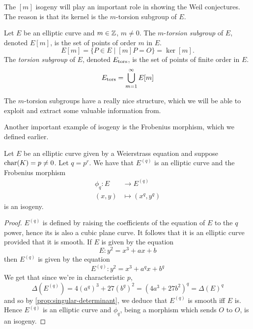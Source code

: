 The $[m]$ isogeny will play an important role in showing the
Weil conjectures. The reason is that its kernel is the $m$-torsion
subgroup of $E$.


\begin{definition}
	Let $E$ be an elliptic curve and $m \in \mathbb{Z}$, $m \neq 0$. The
	$m$-\emph{torsion subgroup} of $E$, denoted $E[m]$, is the set of
	points of order $m$ in $E$.
	\begin{equation*}
		E[m] = \{P \in E \mid [m]P = O\} = \ker[m].
	\end{equation*}
	The \emph{torsion subgroup} of $E$, denoted $E_{\operatorname{tors}}$, is the set of
	points of finite order in $E$.
	\begin{equation*}
		E_{\operatorname{tors}} = \bigcup_{m=1}^\infty E[m]
	\end{equation*}
\end{definition}

The $m$-torsion subgroups have a really nice structure, which we will be
able to exploit and extract some valuable information from.


Another important example of isogeny is the Frobenius morphism,
which we defined earlier.
\begin{proposition}
	Let $E$ be an elliptic curve given by a Weierstrass equation
	and suppose $\operatorname{char}(K) = p \neq 0$. Let
	$q = p^r$. We have that $E^{(q)}$ is an elliptic curve and
	the Frobenius morphism
	\begin{align*}
		\phi_q: E &\to E^{(q)}\\
		(x, y)&\mapsto (x^q, y^q)
	\end{align*}
	is an isogeny.
\end{proposition}
\begin{proof}
	$E^{(q)}$ is defined by raising the coefficients of the equation of $E$
	to the $q$ power, hence its is also a cubic plane curve.
	It follows that it is an elliptic curve provided that it is smooth.
	If $E$ is given by the equation
	\begin{equation*}
		E: y^2 = x^3 + ax + b
	\end{equation*}
	then $E^{(q)}$ is given by the equation
	\begin{equation*}
		E^{(q)}: y^2 = x^3 + a^qx + b^q
	\end{equation*}
	We get that since we're in characteristic $p$,
	\begin{equation*}
		\Delta(E^{(q)}) = 4\left(a^q\right)^3 + 27\left(b^q\right)^2
		= \left(4a^3 + 27b^2\right)^q
		= \Delta(E)^q
	\end{equation*}
	and so by \ref{prop:singular-determinant}, we deduce that
	$E^{(q)}$ is smooth iff $E$ is.
	Hence $E^{(q)}$ is an elliptic curve and $\phi_q$, being a morphism
	which sends $O$ to $O$, is an isogeny.
\end{proof}

